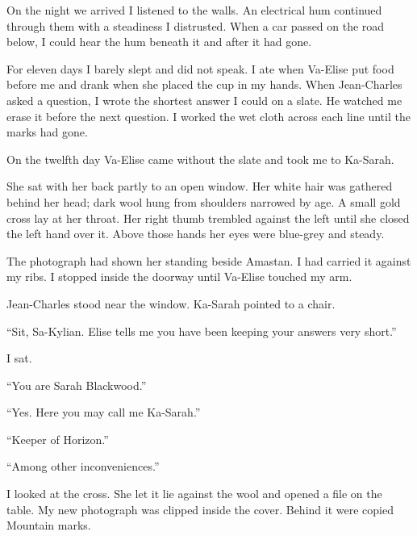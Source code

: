 On the night we arrived I listened to the walls. An electrical hum continued through them with a steadiness I distrusted. When a car passed on the road below, I could hear the hum beneath it and after it had gone.\par

For eleven days I barely slept and did not speak. I ate when Va-Elise put food before me and drank when she placed the cup in my hands. When Jean-Charles asked a question, I wrote the shortest answer I could on a slate. He watched me erase it before the next question. I worked the wet cloth across each line until the marks had gone.\par

On the twelfth day Va-Elise came without the slate and took me to Ka-Sarah.\par

\ornament

She sat with her back partly to an open window. Her white hair was gathered behind her head; dark wool hung from shoulders narrowed by age. A small gold cross lay at her throat. Her right thumb trembled against the left until she closed the left hand over it. Above those hands her eyes were blue-grey and steady.\par

The photograph had shown her standing beside Amastan. I had carried it against my ribs. I stopped inside the doorway until Va-Elise touched my arm.\par

Jean-Charles stood near the window. Ka-Sarah pointed to a chair.\par

``Sit, Sa-Kylian. Elise tells me you have been keeping your answers very short.''\par

I sat.\par

``You are Sarah Blackwood.''\par

``Yes. Here you may call me Ka-Sarah.''\par

``Keeper of Horizon.''\par

``Among other inconveniences.''\par

I looked at the cross. She let it lie against the wool and opened a file on the table. My new photograph was clipped inside the cover. Behind it were copied Mountain marks.\par

